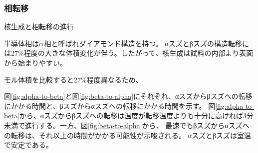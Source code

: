 \subsubsection{相転移}
核生成と相転移の進行

半導体相は$\rm \alpha$相と呼ばれダイアモンド構造を持つ。
αスズとβスズの構造転移には27\%程度の大きな体積変化が伴う。したがって、核生成は試料の内部より表面から始まりやすい\cite{Cornelius}。

モル体積を比較すると27\%程度異なるため、

図\ref{fig:alpha-to-beta}と図\ref{fig:beta-to-alpha}にそれぞれ、αスズからβスズへの転移にかかる時間と、βスズからαスズへの転移にかかる時間を示す\cite{Nogita}。
図\ref{fig:alpha-to-beta}から、αスズからβスズへの転移は温度が転移温度よりも十分に高ければ3分未満で進行する。一方、図\ref{fig:beta-to-alpha}から、
最速でもβスズからαスズへの転移は、それ以上の時間がかかる可能性が示唆される。
αスズとβスズは室温で安定である。
